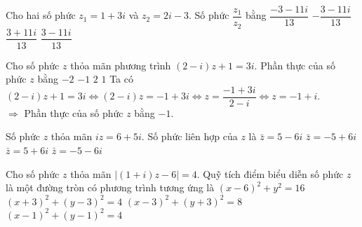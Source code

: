 \begin{ex}%
Cho hai số phức $z_1=1+3i$ và $z_2=2i-3$. Số phức $\dfrac{z_1}{z_2}$ bằng
\choice
{$\dfrac{-3-11i}{13}$}
{$-\dfrac{3-11i}{13}$}
{$\dfrac{3+11i}{13}$}
{\True $\dfrac{3-11i}{13}$}
\end{ex}

\begin{ex}%
Cho số phức $z$ thỏa mãn phương trình $(2-i)z+1=3i$. Phần thực của số phức $z$ bằng
\choice
{$-2$}
{\True $-1$}
{$2$}
{$1$}
\loigiai
{
Ta có $(2-i)z+1=3i\Leftrightarrow (2-i)z=-1+3i\Leftrightarrow z=\dfrac{-1+3i}{2-i}\Leftrightarrow z=-1+i$.\\
$\Rightarrow$ Phần thực của số phức $z$ bằng $-1$.
}
\end{ex}

\begin{ex}%
Số phức $z$ thỏa mãn $iz=6+5i$. Số phức liên hợp của $z$ là
\choice
{$\bar{z}=5-6i$}
{$\bar{z}=-5+6i$}
{\True $\bar{z}=5+6i$}
{$\bar{z}=-5-6i$}
\end{ex}

\begin{ex}%
Cho số phức $z$ thỏa mãn $|(1+i)z-6|=4$. Quỹ tích điểm biểu diễn số phức $z$ là một đường tròn có phương trình tương ứng là
\choice
{$(x-6)^2+y^2=16$}
{$(x+3)^2+(y-3)^2=4$}
{\True $(x-3)^2+(y+3)^2=8$}
{$(x-1)^2+(y-1)^2=4$}
\end{ex}

